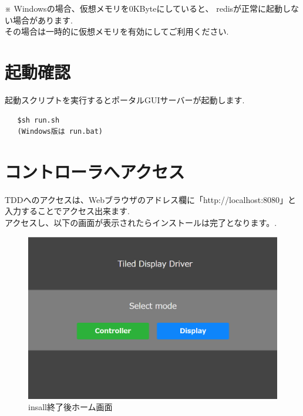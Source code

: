 \documentclass[a4paper,10pt,oneside]{jsbook}
\begin{document}
※
Windowsの場合、仮想メモリを0KByteにしていると、
redisが正常に起動しない場合があります.\\
その場合は一時的に仮想メモリを有効にしてご利用ください.\\

\newpage


\section{起動確認}
起動スクリプトを実行するとポータルGUIサーバーが起動します.
\begin{verbatim}
   $sh run.sh
   (Windows版は run.bat)
\end{verbatim}

\section{コントローラへアクセス}
TDDへのアクセスは、Webブラウザのアドレス欄に「http://localhost:8080」と入力することでアクセス出来ます.\\
アクセスし、以下の画面が表示されたらインストールは完了となります。.\\

\begin{figure}[htbp]
	\begin{center}
		\includegraphics[width=15.5cm]{image/home.png}
	\end{center}
	\caption{insall終了後ホーム画面}
	\label{fig:home}
\end{figure}

\newpage
\end{document}
